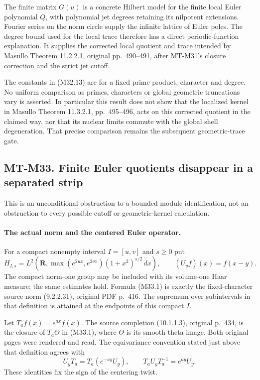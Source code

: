The finite matrix $G(u)$ is a concrete Hilbert model for
the finite local Euler polynomial $Q$, with polynomial
jet degrees retaining its nilpotent extensions.  Fourier
series on the norm circle supply the infinite lattice of
Euler poles.  The degree bound used for the local trace
therefore has a direct periodic-function explanation.
It supplies the corrected local quotient and trace intended
by Masullo Theorem 11.2.2.1, original pp.~490--491,
after MT-M31's closure correction and the strict jet cutoff.

The constants in (M32.13) are for a fixed prime product,
character and degree.  No uniform comparison as primes,
characters or global geometric truncations vary is asserted.
In particular this result does not show that the
localized kernel in Masullo Theorem 11.3.2.1,
pp.~495--496, acts on this corrected quotient in the
claimed way, nor that its nuclear limits commute with
the global shell degeneration.  That precise comparison
remains the subsequent geometric-trace gate.

\subsection*{MT-M33. Finite Euler quotients disappear in a separated strip}

This is an unconditional obstruction to a bounded module
identification, not an obstruction to every possible
cutoff or geometric-kernel calculation.

\paragraph{The actual norm and the centered Euler operator.}
For a compact nonempty interval $I=[u,v]$ and $s\geq0$ put
\[
 H_{I,s}=L^2\left(\mathbf R,
       \max(e^{2ux},e^{2vx})(1+x^2)^{s/2}\,dx\right),
 \qquad (U_yf)(x)=f(x-y).
 \tag{M33.1}
\]
The compact norm-one group may be included with its
volume-one Haar measure; the same estimates hold.
Formula (M33.1) is exactly the fixed-character source norm
(9.2.2.31), original PDF p.~416.  The supremum over
subintervals in that definition is attained at the
endpoints of this compact $I$.

Let $T_af(x)=e^{ax}f(x)$.  The source completion
(10.1.1.3), original p.~434, is the closure of
$T_a\Theta$ in (M33.1), where $\Theta$ is its smooth
theta image.  Both original pages were rendered and
read.  The equivariance convention stated just above
that definition agrees with
\[
 U_yT_a=T_a(e^{-ay}U_y),\qquad
            T_aU_yT_a^{-1}=e^{ay}U_y.
 \tag{M33.2}
\]
These identities fix the sign of the centering twist.

